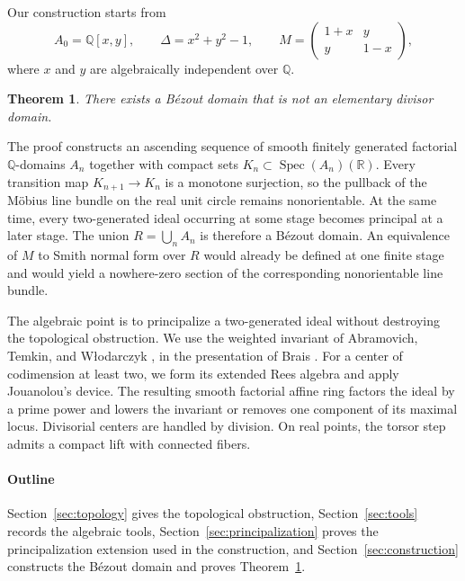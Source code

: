 \documentclass[11pt]{amsart}
\numberwithin{equation}{section}
\newtheorem{theorem}{Theorem}[section]
\theoremstyle{definition}
\newcommand{\Q}{\mathbb{Q}}
\newcommand{\R}{\mathbb{R}}
\DeclareMathOperator{\Spec}{Spec}
\begin{document}
Our construction starts from
\begin{equation}\label{eq:initial-data}
  A_0=\Q[x,y],\qquad
  \Delta=x^2+y^2-1,\qquad
  M=\begin{pmatrix}1+x&y\\ y&1-x\end{pmatrix},
\end{equation}
where $x$ and $y$ are algebraically independent over $\Q$.

\begin{theorem}\label{thm:main}
There exists a B\'ezout domain that is not an elementary divisor domain.
\end{theorem}

The proof constructs an ascending sequence of smooth finitely generated factorial $\Q$-domains $A_n$ together with compact sets $K_n\subset\Spec(A_n)(\R)$. Every transition map $K_{n+1}\to K_n$ is a monotone surjection, so the pullback of the M\"obius line bundle on the real unit circle remains nonorientable. At the same time, every two-generated ideal occurring at some stage becomes principal at a later stage. The union $R=\bigcup_n A_n$ is therefore a B\'ezout domain. An equivalence of $M$ to Smith normal form over $R$ would already be defined at one finite stage and would yield a nowhere-zero section of the corresponding nonorientable line bundle.

The algebraic point is to principalize a two-generated ideal without destroying the topological obstruction. We use the weighted invariant of Abramovich, Temkin, and W{\l}odarczyk \cite{ATW}, in the presentation of Brais \cite{Brais}. For a center of codimension at least two, we form its extended Rees algebra and apply Jouanolou's device. The resulting smooth factorial affine ring factors the ideal by a prime power and lowers the invariant or removes one component of its maximal locus. Divisorial centers are handled by division. On real points, the torsor step admits a compact lift with connected fibers.

\bigskip

\paragraph{\textbf{Outline}} Section~\ref{sec:topology} gives the topological obstruction, Section~\ref{sec:tools} records the algebraic tools, Section~\ref{sec:principalization} proves the principalization extension used in the construction, and Section~\ref{sec:construction} constructs the B\'ezout domain and proves Theorem~\ref{thm:main}.
\end{document}
